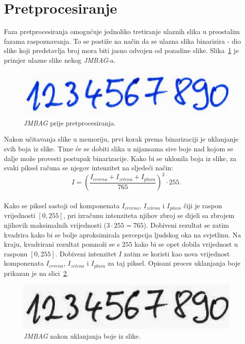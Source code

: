 \section{Pretprocesiranje}
\label{sec:pretprocesiranje}
Faza pretprocesiranja omogućuje jednoliko tretiranje ulaznih slika u preostalim fazama raspoznavanja. To se postiže na
način da se ulazna slika binarizira - dio slike koji predstavlja broj mora biti jasno odvojen od pozadine slike.
Slika\ \ref{fig:preprocessing-original-image} je primjer ulazne slike nekog \emph{JMBAG}-a.
\begin{figure}[!htb]
    \centering
    \includegraphics[width=12cm]{images/chapter4/preprocessing-original-image.png}
    \caption{\emph{JMBAG} prije pretprocesiranja.}
    \label{fig:preprocessing-original-image}
\end{figure}
\newline
Nakon učitavanja slike u memoriju, prvi korak prema binarizaciji je uklanjanje svih boja iz slike. Time će se dobiti
slika u nijansama sive boje nad kojom se dalje može provesti postupak binarizacije. Kako bi se uklonila boja iz slike,
za svaki piksel računa se njegov intenzitet na sljedeći način:\\
\begin{equation}
    I = \left(\frac{I_{crvena} + I_{zelena} + I_{plava}}{765}\right)^{2} \cdot 255.\label{eq:pixel-intensity}
\end{equation}\\
Kako se piksel sastoji od komponenata $I_{crvena}$, $I_{zelena}$ i $I_{plava}$ čiji je raspon vrijednosti $[0, 255]$,
pri izračunu intenziteta njihov zbroj se dijeli sa zbrojem njihovih maksimalnih vrijednosti ($3 \cdot 255 = 765$).
Dobiveni rezultat se zatim kvadrira kako bi se bolje aproksimirala percepcija ljudskog oka na svjetlinu. Na kraju,
kvadrirani rezultat pomnoži se s $255$ kako bi se opet dobila vrijednost u rasponu $[0, 255]$. Dobiveni intenzitet $I$
zatim se koristi kao nova vrijednost komponenata $I_{crvena}$, $I_{zelena}$ i $I_{plava}$ za taj piksel. Opisani proces
uklanjanja boje prikazan je na slici\ \ref{fig:preprocessing-grayscale-image}.\\
\begin{figure}[!htb]
    \centering
    \includegraphics[width=12cm]{images/chapter4/preprocessing-grayscale-image.png}
    \caption{\emph{JMBAG} nakon uklanjanja boje iz slike.}
    \label{fig:preprocessing-grayscale-image}
\end{figure}
